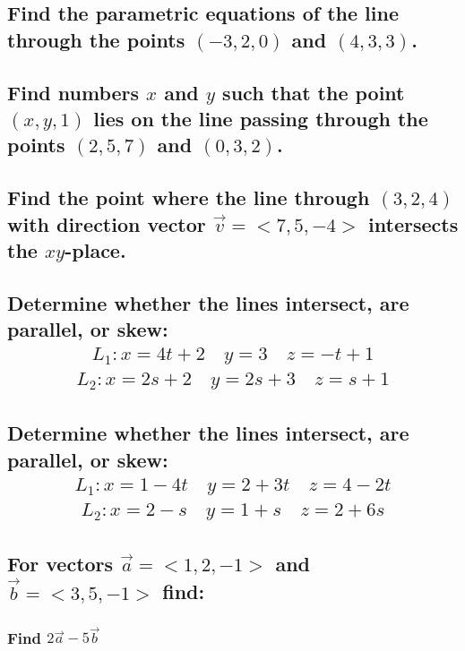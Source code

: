 \documentclass{article}
\begin{document}
\subsection{Find the parametric equations of the line through the points $(-3, 2, 0)$ and $(4, 3, 3)$.}

\subsection{Find numbers $x$ and $y$ such that the point $(x, y, 1)$ lies on the line passing through the points $(2, 5, 7)$ and $(0, 3, 2)$.}

\subsection{Find the point where the line through $(3, 2, 4)$ with direction vector $\vec{v} = <7, 5, -4>$ intersects the $xy$-place.}

\subsection{Determine whether the lines intersect, are parallel, or skew:
	\begin{align*}
		L_1: x = 4t + 2 \quad y = 3 \quad z = -t + 1
	\end{align*}
	\begin{align*}
		L_2: x = 2s + 2 \quad y = 2s + 3 \quad z = s + 1
	\end{align*}
}


\subsection{Determine whether the lines intersect, are parallel, or skew:
	\begin{align*}
		L_1: x = 1 - 4t \quad y = 2 + 3t \quad z = 4 - 2t
	\end{align*}
	\begin{align*}
		L_2: x = 2 - s \quad y = 1 + s \quad z = 2 + 6s
	\end{align*}
}

\subsection{For vectors $\vec{a} = <1, 2, -1>$ and $\vec{b} = <3, 5, -1>$ find:}
\subsubsection{Find $2\vec{a} - 5\vec{b}$}
\end{document}
